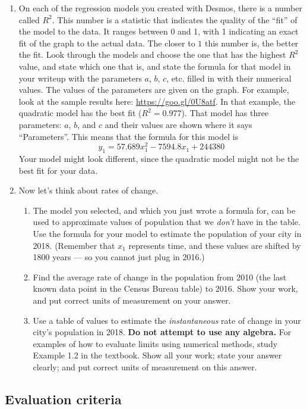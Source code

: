 \documentclass[11pt,letterpaper]{article}
\begin{document}
\begin{enumerate}
	\item On each of the regression models you created with Desmos, there is a number called $R^2$. This number is a statistic that indicates the quality of the ``fit'' of the model to the data. It ranges between 0 and 1, with 1 indicating an exact fit of the graph to the actual data.  The closer to $1$ this number is, the better the fit. Look through the models and choose the one that has the highest $R^2$ value, and state which one that is, and state the formula for that model in your writeup with the parameters $a$, $b$, $c$, etc. filled in with their numerical values. The values of the parameters are given on the graph. For example, look at the sample results here: \url{https://goo.gl/0U8atf}. In that example, the quadratic model has the best fit ($R^2 = 0.977$). That model has three parameters: $a$, $b$, and $c$ and their values are shown where it says ``Parameters''. This means that the formula for this model is
	$$y_1 = 57.689x_1^2 - 7594.8x_1 + 244380$$
	Your model might look different, since the quadratic model might not be the best fit for your data. 


	\item Now let's think about rates of change. 
		\begin{enumerate}
			\item The model you selected, and which you just wrote a formula for, can be used to approximate values of population that we \textit{don't} have in the table. Use the formula for your model to estimate the population of your city in 2018. (Remember that $x_1$ represents time, and these values are shifted by 1800 years --- so you cannot just plug in 2016.) 
			\item Find the average rate of change in the population from 2010 (the last known data point in the Census Bureau table) to 2016. Show your work, and put correct units of measurement on your answer. 
			\item Use a table of values to estimate the \emph{instantaneous} rate of change in your city's population in 2018. \textbf{Do not attempt to use any algebra.} For examples of how to evaluate limits using numerical methods, study Example 1.2 in the textbook. Show all your work; state your answer clearly; and put correct units of measurement on this answer. 
		\end{enumerate}

\end{enumerate}

\subsection*{Evaluation criteria}
\end{document}
